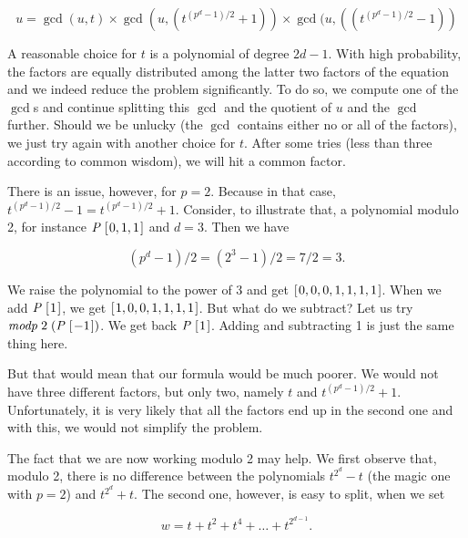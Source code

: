 \documentclass[tikz]{scrreprt}
\newcommand{\Conid}[1]{\mathit{#1}}
\newcommand{\Varid}[1]{\mathit{#1}}
\begin{document}
\begin{equation}\label{eq:polyFac_CZ1}
u = \gcd(u,t)\times\gcd(u,(t^{(p^d-1)/2} + 1))\times\gcd(u,((t^{(p^d-1)/2} - 1))
\end{equation}

A reasonable choice for $t$ is a polynomial
of degree $2d-1$. 
With high probability, the factors are equally distributed
among the latter two factors of the equation and 
we indeed reduce the problem significantly.
To do so, we compute one of the $\gcd$s and continue splitting
this $\gcd$ and the quotient of $u$ and the $\gcd$ further.
Should we be unlucky (the $\gcd$ contains either no or all
of the factors), we just try again with another choice for $t$.
After some tries (less than three according to common wisdom), 
we will hit a common factor.

There is an issue, however, for $p=2$.
Because in that case, 
$t^{(p^d-1)/2} - 1 = t^{(p^d-1)/2} + 1$.
Consider, to illustrate that, a polynomial modulo 2, for instance
\ensuremath{\Conid{P}\;[\mskip1.5mu \mathrm{0},\mathrm{1},\mathrm{1}\mskip1.5mu]} and $d=3$. Then we have 

\[
(p^d-1)/2 = (2^3-1)/2 = 7/2 = 3.
\]

We raise the polynomial to the power of 3 and get \ensuremath{[\mskip1.5mu \mathrm{0},\mathrm{0},\mathrm{0},\mathrm{1},\mathrm{1},\mathrm{1},\mathrm{1}\mskip1.5mu]}.
When we add \ensuremath{\Conid{P}\;[\mskip1.5mu \mathrm{1}\mskip1.5mu]}, we get \ensuremath{[\mskip1.5mu \mathrm{1},\mathrm{0},\mathrm{0},\mathrm{1},\mathrm{1},\mathrm{1},\mathrm{1}\mskip1.5mu]}. 
But what do we subtract? Let us try \ensuremath{\Varid{modp}\;\mathrm{2}\;(\Conid{P}\;[\mskip1.5mu \mathbin{-}\mathrm{1}\mskip1.5mu])}.
We get back \ensuremath{\Conid{P}\;[\mskip1.5mu \mathrm{1}\mskip1.5mu]}. 
Adding and subtracting 1 is just the same thing here.

But that would mean that our formula would be much poorer.
We would not have three different factors, but only two, namely
$t$ and $t^{(p^d-1)/2} + 1$. Unfortunately, it is very likely
that all the factors end up in the second one and with this,
we would not simplify the problem.

The fact that we are now working modulo 2
may help. We first observe that, modulo 2, there is
no difference between the polynomials 
$t^{2^d} - t$ (the magic one with $p=2$) and 
$t^{2^d} + t$. 
The second one, however, is easy to split,
when we set 

\[
w = t + t^2 + t^4 + \dots + t^{2^{d-1}}.
\]
\end{document}
